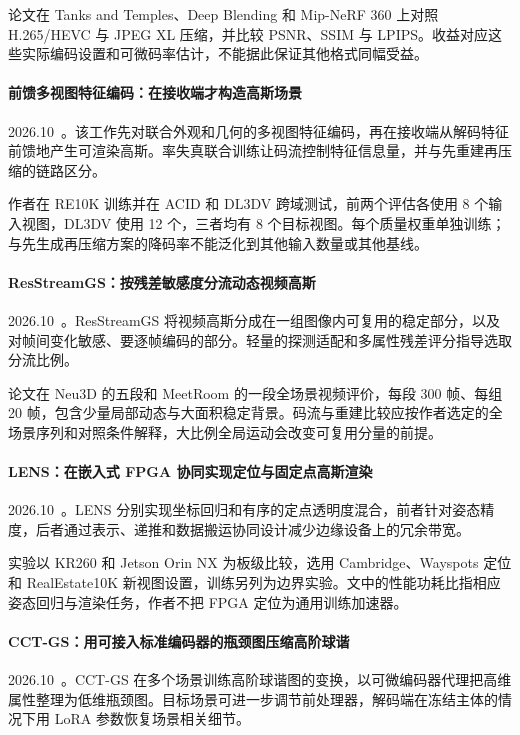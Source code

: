 论文在 Tanks and Temples、Deep Blending 和 Mip-NeRF 360 上对照 H.265/HEVC 与 JPEG XL 压缩，并比较 PSNR、SSIM 与 LPIPS。收益对应这些实际编码设置和可微码率估计，不能据此保证其他格式同幅受益。

\paragraph{前馈多视图特征编码：在接收端才构造高斯场景}
2026.10~\cite{2610_20590}。该工作先对联合外观和几何的多视图特征编码，再在接收端从解码特征前馈地产生可渲染高斯。率失真联合训练让码流控制特征信息量，并与先重建再压缩的链路区分。

作者在 RE10K 训练并在 ACID 和 DL3DV 跨域测试，前两个评估各使用 8 个输入视图，DL3DV 使用 12 个，三者均有 8 个目标视图。每个质量权重单独训练；与先生成再压缩方案的降码率不能泛化到其他输入数量或其他基线。

\paragraph{ResStreamGS：按残差敏感度分流动态视频高斯}
2026.10~\cite{2610_21121}。ResStreamGS 将视频高斯分成在一组图像内可复用的稳定部分，以及对帧间变化敏感、要逐帧编码的部分。轻量的探测适配和多属性残差评分指导选取分流比例。

论文在 Neu3D 的五段和 MeetRoom 的一段全场景视频评价，每段 300 帧、每组 20 帧，包含少量局部动态与大面积稳定背景。码流与重建比较应按作者选定的全场景序列和对照条件解释，大比例全局运动会改变可复用分量的前提。

\paragraph{LENS：在嵌入式 FPGA 协同实现定位与固定点高斯渲染}
2026.10~\cite{2610_25068}。LENS 分别实现坐标回归和有序的定点透明度混合，前者针对姿态精度，后者通过表示、递推和数据搬运协同设计减少边缘设备上的冗余带宽。

实验以 KR260 和 Jetson Orin NX 为板级比较，选用 Cambridge、Wayspots 定位和 RealEstate10K 新视图设置，训练另列为边界实验。文中的性能功耗比指相应姿态回归与渲染任务，作者不把 FPGA 定位为通用训练加速器。

\paragraph{CCT-GS：用可接入标准编码器的瓶颈图压缩高阶球谐}
2026.10~\cite{2610_26920}。CCT-GS 在多个场景训练高阶球谐图的变换，以可微编码器代理把高维属性整理为低维瓶颈图。目标场景可进一步调节前处理器，解码端在冻结主体的情况下用 LoRA 参数恢复场景相关细节。

